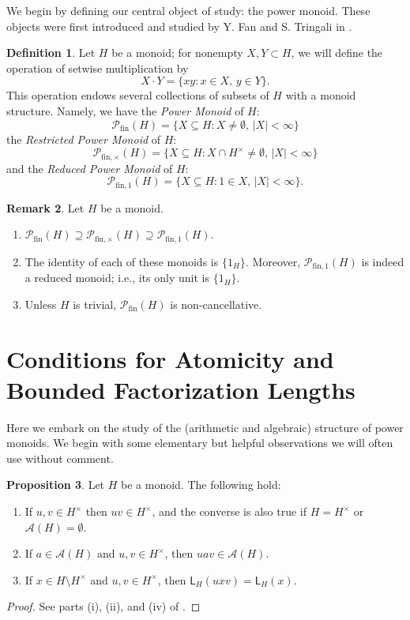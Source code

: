\documentclass{report}
\renewcommand{\P}{\mathcal{P}}
\newcommand{\fin}{\textrm{fin}}
\newcommand{\funt}{{\textrm{fin}, \times}}
\newcommand{\fun}{{\textrm{fin}, 1}}
\renewcommand{\:}{\text{:}}
\theoremstyle{definition}
\newtheorem{defn}{Definition}[section]
\newtheorem{prop}[defn]{Proposition}
\newtheorem{rk}[defn]{Remark}
\begin{document}
We begin by defining our central object of study: the power monoid.
These objects were first introduced and studied by Y. Fan and S. Tringali in \cite{fan-tringali18}.

\begin{defn}
Let $H$ be a monoid; for nonempty $X,Y\subset H$, we will define the operation of setwise multiplication by
\[X \cdot Y = \{xy : x\in X,\, y\in Y \}. \]
This operation endows several collections of subsets of $H$ with a monoid structure.  
Namely, we have the \textit{Power Monoid} of $H$:
\[ \P_\fin(H) = \{ X \subseteq H: X\neq \emptyset,\, |X| < \infty \}\]
the \textit{Restricted Power Monoid} of $H$:
\[ \P_\funt(H) = \{ X \subseteq H: X \cap H^\times \neq \emptyset,\,|X| < \infty \} \]
and the \textit{Reduced Power Monoid} of $H$:
\[ \P_\fun(H) = \{ X \subseteq H: 1\in X, \,  |X| < \infty \}. \]
\end{defn}

\begin{rk} Let $H$ be a monoid.
\begin{enumerate}[label={\rm (\roman{*})}]
\item $\P_\fin(H) \supseteq \P_\funt(H) \supseteq \P_\fun(H)$.
\item The identity of each of these monoids is $\{1_H\}$.
Moreover, $\P_\fun(H)$ is indeed a reduced monoid; i.e., its only unit is $\{1_H\}$.
\item Unless $H$ is trivial, $\P_\fin(H)$ is non-cancellative.
\end{enumerate}
\end{rk}

\section{Conditions for Atomicity and Bounded Factorization Lengths} \label{sec:atomicity}

Here we embark on the study of the (arithmetic and algebraic) structure of power monoids.
We begin with some elementary but helpful observations we will often use without comment.
%
\begin{prop}\label{prop:unit-adjust}
	Let $H$ be a monoid.
	The following hold:
	\begin{enumerate}[label={\rm (\roman{*})}]
		\item\label{it:prop:unit-adjust(0)} If $u, v \in H^\times$ then $uv \in H^\times$, and the converse is also true if $H=H^\times$ or $\mathscr A(H)=\emptyset$.
		\item\label{it:prop:unit-adjust(i)} If $a\in \mathscr{A}(H)$ and $u, v \in H^\times$, then $uav\in \mathscr{A}(H)$.
		\item\label{it:prop:unit-adjust(ii)} If $x\in H\setminus H^\times$ and $u, v \in H^\times$, then $\mathsf{L}_H(uxv) = \mathsf{L}_H(x)$.
	\end{enumerate}
\end{prop}
%
\begin{proof}
	See parts (i), (ii), and (iv) of \cite[Lemma 2.2]{fan-tringali18}.
\end{proof}
\end{document}
